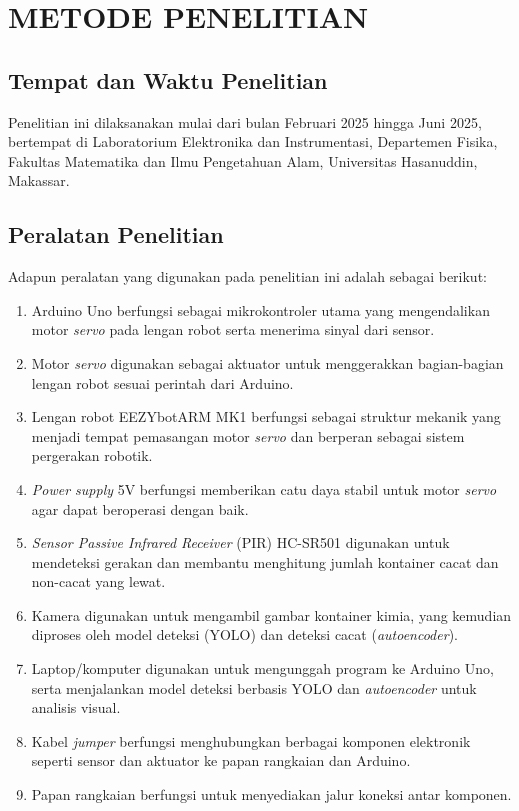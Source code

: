 \chapter{METODE PENELITIAN}
\section{Tempat dan Waktu Penelitian}
Penelitian ini dilaksanakan mulai dari bulan Februari 2025 hingga Juni
2025, bertempat di Laboratorium Elektronika dan Instrumentasi,
Departemen Fisika, Fakultas Matematika dan Ilmu Pengetahuan Alam,
Universitas Hasanuddin, Makassar.

\vspace{1em}

\section{Peralatan Penelitian}
Adapun peralatan yang digunakan pada penelitian ini adalah sebagai berikut:
\begin{enumerate}
  \item Arduino Uno berfungsi sebagai mikrokontroler utama yang
    mengendalikan motor \textit{servo} pada lengan robot serta menerima sinyal
    dari sensor.
  \item Motor \textit{servo} digunakan sebagai aktuator untuk menggerakkan
    bagian-bagian lengan robot sesuai perintah dari Arduino.
  \item Lengan robot EEZYbotARM MK1 berfungsi sebagai struktur
    mekanik yang menjadi tempat pemasangan motor \textit{servo} dan berperan
    sebagai sistem pergerakan robotik.
  \item \textit{Power supply} 5V berfungsi memberikan catu daya stabil untuk
    motor \textit{servo} agar dapat beroperasi dengan baik.
  \item \textit{Sensor Passive Infrared Receiver} (PIR) HC-SR501
    digunakan untuk mendeteksi gerakan dan membantu
    menghitung jumlah kontainer cacat dan non-cacat yang lewat.
  \item Kamera digunakan untuk mengambil gambar kontainer kimia, yang
    kemudian diproses oleh model deteksi (YOLO) dan deteksi cacat
    (\textit{autoencoder}).
  \item Laptop/komputer digunakan untuk mengunggah program ke Arduino
    Uno, serta menjalankan model deteksi berbasis YOLO dan
    \textit{autoencoder} untuk analisis visual.
  \item Kabel \textit{jumper} berfungsi menghubungkan berbagai komponen
    elektronik seperti sensor dan aktuator ke papan rangkaian dan
    Arduino.
  \item Papan rangkaian berfungsi untuk menyediakan jalur koneksi
    antar komponen.
\end{enumerate}

